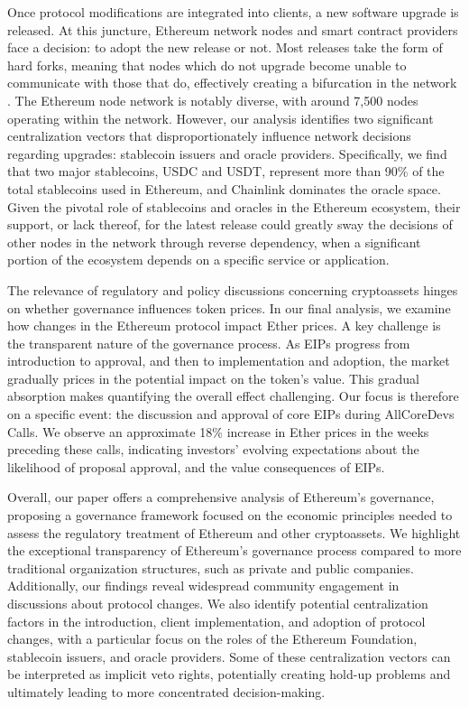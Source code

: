 \documentclass[No]{AEA}
\begin{document}
Once protocol modifications are integrated into clients, a new software upgrade is released. At this juncture, Ethereum network nodes and smart contract providers face a decision: to adopt the new release or not. Most releases take the form of hard forks, meaning that nodes which do not upgrade become unable to communicate with those that do, effectively creating a bifurcation in the network \citep{FS:20}. The Ethereum node network is notably diverse, with around 7,500 nodes operating within the network. However, our analysis identifies two significant centralization vectors that disproportionately influence network decisions regarding upgrades: stablecoin issuers and oracle providers. Specifically, we find that two major stablecoins, USDC and USDT, represent more than 90\% of the total stablecoins used in Ethereum, and Chainlink dominates the oracle space. Given the pivotal role of stablecoins and oracles in the Ethereum ecosystem, their support, or lack thereof, for the latest release could greatly sway the decisions of other nodes in the network through reverse dependency, when a significant portion of the ecosystem depends on a specific service or application. 

The relevance of regulatory and policy discussions concerning cryptoassets hinges on whether governance influences token prices. In our final analysis, we examine how changes in the Ethereum protocol impact Ether prices. A key challenge is the transparent nature of the governance process. As EIPs progress from introduction to approval, and then to implementation and adoption, the market gradually prices in the potential impact on the token’s value. This gradual absorption makes quantifying the overall effect challenging. Our focus is therefore on a specific event: the discussion and approval of core EIPs during AllCoreDevs Calls. We observe an approximate 18\% increase in Ether prices in the weeks preceding these calls, indicating investors' evolving expectations about the likelihood of proposal approval, and the value consequences of EIPs. 

Overall, our paper offers a comprehensive analysis of Ethereum's governance, proposing a governance framework focused on the economic principles needed to assess the regulatory treatment of Ethereum and other cryptoassets. We highlight the exceptional transparency of Ethereum's governance process compared to more traditional organization structures, such as private and public companies. Additionally, our findings reveal widespread community engagement in discussions about protocol changes. We also identify potential centralization factors in the introduction, client implementation, and adoption of protocol changes, with a particular focus on the roles of the Ethereum Foundation, stablecoin issuers, and oracle providers. Some of these centralization vectors can be interpreted as implicit veto rights, potentially creating hold-up problems and ultimately leading to more concentrated decision-making. 
\end{document}
